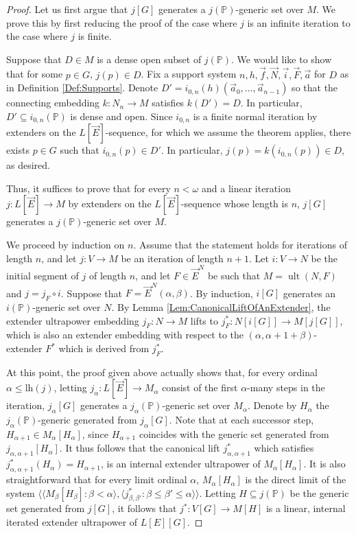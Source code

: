 \documentclass{article}
\theoremstyle{definition}
\theoremstyle{plain}
\newcommand{\po}{\mathbb{P}}
\newcommand{\la}{\langle}
\newcommand{\ra}{\rangle}
\DeclareMathOperator{\Ult}{ult}
\begin{document}
\begin{proof}

    
    Let us first argue that $j[G]$ generates a $j(\po)$-generic set over $M$. We prove this by first reducing the proof of the case where $j$ is an infinite iteration to the case where $j$ is finite.
    
    Suppose that $D\in M$ is a dense open subset of $j(\po)$. We would like to show that for some $p\in G$, $j(p)\in D$. Fix a support system $n, h, \vec{f}, \vec{N}, \vec{i}, \vec{F}, \vec{a}$ for $D$ as in Definition \ref{Def:Supports}. Denote $D' = i_{0,n}(h)( \vec{a}_0,\ldots, \vec{a}_{n-1} )$ so that the connecting embedding $k\colon N_n\to M$ satisfies $k(D') = D$. In particular, $D'\subseteq i_{0,n}(\po)$ is dense and open. Since $i_{0,n}$ is a finite normal iteration by extenders on the $L[\vec E]$-sequence, for which we assume the theorem applies,  there exists $p\in G$ such that $i_{0,n}(p)\in D'$. In particular, $j(p) = k(i_{0,n}(p)) \in D$, as desired. 

    Thus, it suffices to prove that for every $n<\omega$ and a linear iteration $j\colon L[\vec E]\to M$ by extenders on the $L[\vec{E}]$-sequence whose length is $n$, $j[G]$ generates a $j(\po)$-generic set over $M$. 
    
    We proceed by induction on $n$. Assume that the statement holds for iterations of length $n$, and let $j\colon V\to M$ be an iteration of length $n+1$. Let $i\colon V\to N$ be the initial segment of $j$ of length $n$, and let $F\in\vec E^N$ be such that $M=\Ult(N,F)$ and $j=j_F\circ i$. Suppose that $F=\vec E^N(\alpha,\beta)$. By induction, $i[G]$ generates an $i(\po)$-generic set over $N$. By Lemma \ref{Lem:CanonicalLiftOfAnExtender}, the extender ultrapower embedding $j_F\colon N\to M$ lifts to $j^*_F\colon N[i[G]]\to M[j[G]]$, which is also an extender embedding with respect to the $(\alpha, \alpha+1+\beta)$-extender $F^*$ which is derived from $j^*_F$.


    At this point, the proof given above actually shows that, for every ordinal $\alpha\leq \text{lh}(j)$, letting $j_\alpha\colon L[\vec E]\to M_\alpha$ consist of the first $\alpha$-many steps in the iteration, $j_\alpha[G]$ generates a $j_\alpha(\po)$-generic set over $M_\alpha$. Denote by $H_\alpha$ the $j_{\alpha}(\po)$-generic generated from $j_\alpha[G]$. Note that at each successor step, $H_{\alpha+1}\in M_\alpha[H_\alpha]$, since $H_{\alpha+1}$ coincides with the generic set generated from $j_{\alpha,\alpha+1}[ H_\alpha ]$. It thus follows that the canonical lift $j^*_{\alpha,\alpha+1}$ which satisfies $j^*_{\alpha,\alpha+1}(H_\alpha) = H_{\alpha+1}$, is an internal extender ultrapower of $M_\alpha[H_\alpha]$. It is also straightforward that for every limit ordinal $\alpha$, $M_{\alpha}[H_\alpha]$ is the direct limit of the system $\la \la M_\beta[H_\beta] \colon \beta<\alpha \ra, \la j^*_{\beta,\beta'} \colon \beta\leq \beta'\leq \alpha \ra \ra$. Letting $H\subseteq j(\po)$ be the generic set generated from $j[G]$, it follows that $j^*\colon V[G]\to M[H]$ is a linear, internal iterated extender ultrapower of $L[E][G]$. 
\end{proof}
\end{document}
